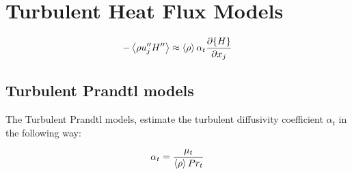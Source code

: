 \section{Turbulent Heat Flux Models}

\begin{equation}
-\left<{ \rho u''_j H''}\right> \approx \left<{\rho}\right> \alpha_t \frac{\partial \{{H}\}}{\partial {x_j}}
\end{equation}

\subsection{Turbulent Prandtl models}

The Turbulent Prandtl models, estimate the turbulent diffusivity coefficient $\alpha_t$ in the following way:

\begin{equation}
\alpha_t = \frac{\mu_t}{\left<{\rho}\right>Pr_t}
\end{equation}